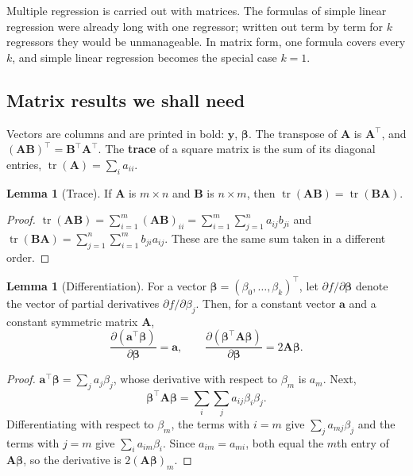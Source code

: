 \documentclass[11pt,a4paper]{article}
\numberwithin{equation}{section}
\theoremstyle{definition}
\newtheorem{lem}[thm]{Lemma}
\begin{document}
Multiple regression is carried out with matrices. The formulas of simple linear regression
were already long with one regressor; written out term by term for $k$ regressors they would
be unmanageable. In matrix form, one formula covers every $k$, and simple linear regression
becomes the special case $k = 1$.

\subsection{Matrix results we shall need}
Vectors are columns and are printed in bold: $\mathbf{y}$, $\boldsymbol\beta$. The
transpose of $\mathbf{A}$ is $\mathbf{A}^\top$, and $(\mathbf{AB})^\top = \mathbf{B}^\top \mathbf{A}^\top$.
The \textbf{trace} of a square matrix is the sum of its diagonal entries,
$\operatorname{tr}(\mathbf{A}) = \sum_i a_{ii}$.

\begin{lem}[Trace]\label{lem:trace}
If $\mathbf{A}$ is $m \times n$ and $\mathbf{B}$ is $n \times m$, then
$\operatorname{tr}(\mathbf{AB}) = \operatorname{tr}(\mathbf{BA})$.
\end{lem}

\begin{proof}
$\operatorname{tr}(\mathbf{AB}) = \sum_{i=1}^m (\mathbf{AB})_{ii} = \sum_{i=1}^m \sum_{j=1}^n a_{ij} b_{ji}$
and $\operatorname{tr}(\mathbf{BA}) = \sum_{j=1}^n \sum_{i=1}^m b_{ji} a_{ij}$. These are the
same sum taken in a different order.
\end{proof}

\begin{lem}[Differentiation]\label{lem:diff}
For a vector $\boldsymbol\beta = (\beta_0, \dots, \beta_k)^\top$, let
$\partial f / \partial \boldsymbol\beta$ denote the vector of partial derivatives
$\partial f / \partial \beta_j$. Then, for a constant vector $\mathbf{a}$ and a constant
symmetric matrix $\mathbf{A}$,
\[
\frac{\partial (\mathbf{a}^\top \boldsymbol\beta)}{\partial \boldsymbol\beta} = \mathbf{a},
\qquad
\frac{\partial (\boldsymbol\beta^\top \mathbf{A} \boldsymbol\beta)}{\partial \boldsymbol\beta} = 2\mathbf{A}\boldsymbol\beta .
\]
\end{lem}

\begin{proof}
$\mathbf{a}^\top \boldsymbol\beta = \sum_j a_j \beta_j$, whose derivative with respect to
$\beta_m$ is $a_m$. Next,
\[
\boldsymbol\beta^\top \mathbf{A} \boldsymbol\beta = \sum_i \sum_j a_{ij} \beta_i \beta_j .
\]
Differentiating with respect to $\beta_m$, the terms with $i = m$ give $\sum_j a_{mj}\beta_j$
and the terms with $j = m$ give $\sum_i a_{im}\beta_i$. Since $a_{im} = a_{mi}$, both equal
the $m$th entry of $\mathbf{A}\boldsymbol\beta$, so the derivative is
$2(\mathbf{A}\boldsymbol\beta)_m$.
\end{proof}
\end{document}
